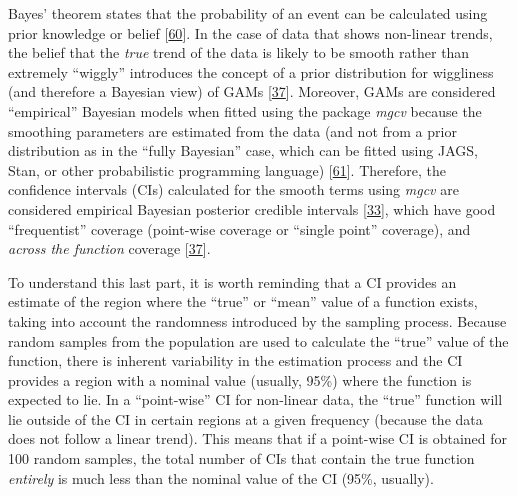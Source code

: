 \documentclass[
]{article}
\begin{document}
Bayes' theorem states that the probability of an event can be calculated using prior knowledge or belief {[}\protect\hyperlink{ref-mcelreath2018}{60}{]}. In the case of data that shows non-linear trends, the belief that the \emph{true} trend of the data is likely to be smooth rather than extremely ``wiggly'' introduces the concept of a prior distribution for wiggliness (and therefore a Bayesian view) of GAMs {[}\protect\hyperlink{ref-wood2017}{37}{]}. Moreover, GAMs are considered ``empirical'' Bayesian models when fitted using the package \emph{mgcv} because the smoothing parameters are estimated from the data (and not from a prior distribution as in the ``fully Bayesian'' case, which can be fitted using JAGS, Stan, or other probabilistic programming language) {[}\protect\hyperlink{ref-miller2019}{61}{]}. Therefore, the confidence intervals (CIs) calculated for the smooth terms using \emph{mgcv} are considered empirical Bayesian posterior credible intervals {[}\protect\hyperlink{ref-pedersen2019}{33}{]}, which have good ``frequentist'' coverage (point-wise coverage or ``single point'' coverage), and \emph{across the function} coverage {[}\protect\hyperlink{ref-wood2017}{37}{]}.

To understand this last part, it is worth reminding that a CI provides an estimate of the region where the ``true'' or ``mean'' value of a function exists, taking into account the randomness introduced by the sampling process. Because random samples from the population are used to calculate the ``true'' value of the function, there is inherent variability in the estimation process and the CI provides a region with a nominal value (usually, 95\%) where the function is expected to lie. In a ``point-wise'' CI for non-linear data, the ``true'' function will lie outside of the CI in certain regions at a given frequency (because the data does not follow a linear trend). This means that if a point-wise CI is obtained for 100 random samples, the total number of CIs that contain the true function \emph{entirely} is much less than the nominal value of the CI (95\%, usually).
\end{document}

